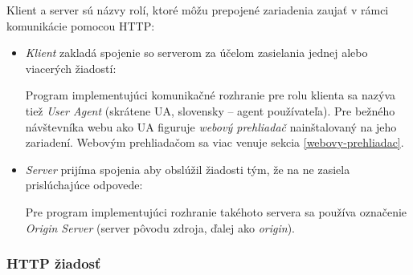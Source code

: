 Klient a server sú názvy rolí, ktoré môžu prepojené zariadenia zaujať v rámci komunikácie pomocou HTTP:
\begin{itemize}
    \item \emph{Klient} zakladá spojenie so serverom za účelom zasielania jednej alebo viacerých \mbox{žiadostí}: 
    
    Program implementujúci komunikačné rozhranie pre rolu klienta sa nazýva tiež \emph{User Agent} \cite{rfc9110} (skrátene UA, slovensky -- agent používateľa). 
    Pre bežného návštevníka webu ako UA \mbox{figuruje} \emph{webový prehliadač} nainštalovaný na jeho zariadení. 
    Webovým prehliadačom sa viac venuje sekcia \ref{webovy-prehliadac}.
    
    \item \emph{Server} prijíma spojenia aby obslúžil žiadosti tým, že na ne zasiela prislúchajúce odpovede:

    Pre program implementujúci rozhranie takéhoto servera sa používa označenie \emph{Origin Server} (server pôvodu zdroja, ďalej ako \emph{origin}).
\end{itemize}


\subsubsection{HTTP žiadosť}

